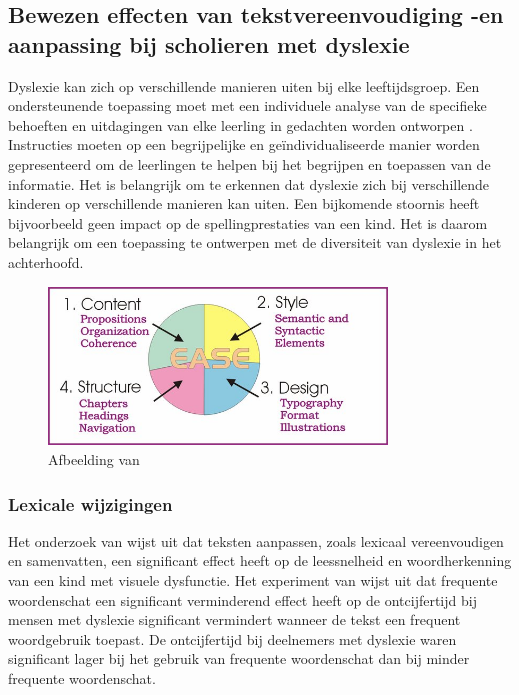 \subsection{Bewezen effecten van tekstvereenvoudiging -en aanpassing bij scholieren met dyslexie}

Dyslexie kan zich op verschillende manieren uiten bij elke leeftijdsgroep. Een ondersteunende toepassing moet met een individuele analyse van de specifieke behoeften en uitdagingen van elke leerling in gedachten worden ontworpen \autocite{Gooding2022}. Instructies moeten op een begrijpelijke en geïndividualiseerde manier worden gepresenteerd om de leerlingen te helpen bij het begrijpen en toepassen van de informatie. Het is belangrijk om te erkennen dat dyslexie zich bij verschillende kinderen op verschillende manieren kan uiten. Een bijkomende stoornis heeft bijvoorbeeld geen impact op de spellingprestaties van een kind. Het is daarom belangrijk om een toepassing te ontwerpen met de diversiteit van dyslexie in het achterhoofd.

\begin{figure}[H]
	\begin{center}
		\includegraphics[width=9cm]{img/text-simplification-reading-ease.png}
	\end{center}
	\caption{Afbeelding van \textcite{Dubay2004}}
\end{figure}


\subsubsection{Lexicale wijzigingen}

Het onderzoek van \textcite{RiveroContreras2021} wijst uit dat teksten aanpassen, zoals lexicaal vereenvoudigen en samenvatten, een significant effect heeft op de leessnelheid en woordherkenning van een kind met visuele dysfunctie. Het experiment van \textcite{Rello2013a} wijst uit dat frequente woordenschat een significant verminderend effect heeft op de ontcijfertijd bij mensen met dyslexie significant vermindert wanneer de tekst een frequent woordgebruik toepast. De ontcijfertijd bij deelnemers met dyslexie waren significant lager bij het gebruik van frequente woordenschat dan bij minder frequente woordenschat.

